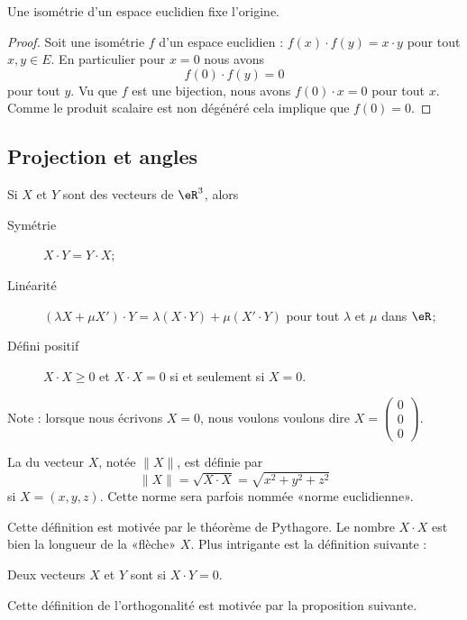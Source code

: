 \begin{lemma}       \label{LEMooYXJZooWKRFRu}
    Une isométrie d'un espace euclidien fixe l'origine.
\end{lemma}

\begin{proof}
    Soit une isométrie \( f\) d'un espace euclidien : \( f(x)\cdot f(y)=x\cdot y\) pour tout \( x,y\in E\). En particulier pour \( x=0\) nous avons
    \begin{equation}
        f(0)\cdot f(y)=0
    \end{equation}
    pour tout \( y\). Vu que \( f\) est une bijection, nous avons \( f(0)\cdot x=0\) pour tout \( x\). Comme le produit scalaire est non dégénéré cela implique que \( f(0)=0\).
\end{proof}

\subsection{Projection et angles}

\begin{proposition}
	Si $X$ et $Y$ sont des vecteurs de $\eR^3$, alors
	\begin{description}
		\item[Symétrie] $X\cdot Y=Y\cdot X$;
		\item[Linéarité] $(\lambda X+\mu X')\cdot Y=\lambda(X\cdot Y)+\mu(X'\cdot Y)$ pour tout $\lambda$ et $\mu$ dans $\eR$;
		\item[Défini positif] $X\cdot X\geq 0$ et $X\cdot X=0$ si et seulement si $X=0$.
	\end{description}
\end{proposition}
Note : lorsque nous écrivons $X=0$, nous voulons voulons dire $X=\begin{pmatrix}
	0	\\
	0	\\
	0
\end{pmatrix}$.


\begin{definition}
	La  du vecteur $X$, notée $\| X \|$, est définie par
	\begin{equation}
		\| X \|=\sqrt{X\cdot X}=\sqrt{x^2+y^2+z^2}
	\end{equation}
	si $X=(x,y,z)$. Cette norme sera parfois nommée «norme euclidienne».
\end{definition}
Cette définition est motivée par le théorème de Pythagore. Le nombre $X\cdot X$ est bien la longueur de la «flèche» $X$. Plus intrigante est la définition suivante :
\begin{definition}
	Deux vecteurs $X$ et $Y$ sont  si $X\cdot Y=0$.
\end{definition}
Cette définition de l'orthogonalité est motivée par la proposition suivante.

